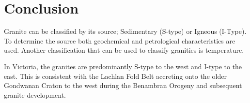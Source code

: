 \documentclass[a4paper]{article}
\begin{document}
\section{Conclusion}

Granite can be classified by its source; Sedimentary (S-type) or Igneous (I-Type). To determine the source both geochemical and petrological characteristics are used.
Another classification that can be used to classify granities is temperature.

In Victoria, the granites are predominantly S-type to the west and I-type to the east. This is consistent with the Lachlan Fold Belt accreting onto the older Gondwanan Craton to the west during the Benambran Orogeny and subsequent granite development.
\newpage


\end{document}
